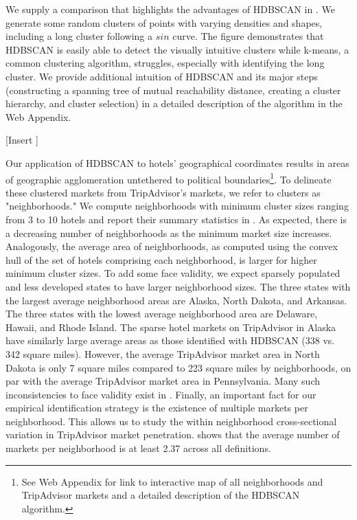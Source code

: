 \documentclass{informs_mod} %
\begin{document}
We supply a comparison that highlights the advantages of HDBSCAN in . We generate some random clusters of points with varying densities and shapes, including a long cluster following a $sin$ curve. The figure demonstrates that HDBSCAN is easily able to detect the visually intuitive clusters while k-means, a common clustering algorithm, struggles, especially with identifying the long cluster. We provide additional intuition of HDBSCAN and its major steps (constructing a spanning tree of mutual reachability distance, creating a cluster hierarchy, and cluster selection) in a detailed description of the algorithm in the Web Appendix.

[Insert ]

Our application of HDBSCAN to hotels' geographical coordinates results in areas of geographic agglomeration untethered to political boundaries\footnote{See Web Appendix for link to interactive map of all neighborhoods and TripAdvisor markets and a detailed description of the HDBSCAN algorithm.}. To delineate these clustered markets from TripAdvisor's markets, we refer to clusters as "neighborhoods." We compute neighborhoods with minimum cluster sizes ranging from 3 to 10 hotels and report their summary statistics in . As expected, there is a decreasing number of neighborhoods as the minimum market size increases. Analogously, the average area of neighborhoods, as computed using the convex hull of the set of hotels comprising each neighborhood, is larger for higher minimum cluster sizes. To add some face validity, we expect sparsely populated and less developed states to have larger neighborhood sizes. The three states with the largest average neighborhood areas are Alaska, North Dakota, and Arkansas. The three states with the lowest average neighborhood area are Delaware, Hawaii, and Rhode Island. The sparse hotel markets on TripAdvisor in Alaska have similarly large average areas as those identified with HDBSCAN (338 vs. 342 square miles). However, the average TripAdvisor market area in North Dakota is only 7 square miles compared to 223 square miles by neighborhoods, on par with the average TripAdvisor market area in Pennsylvania. Many such inconsistencies to face validity exist in . Finally, an important fact for our empirical identification strategy is the existence of multiple markets per neighborhood. This allows us to study the within neighborhood cross-sectional variation in TripAdvisor market penetration.  shows that the average number of markets per neighborhood is at least 2.37 across all definitions.
\end{document}

